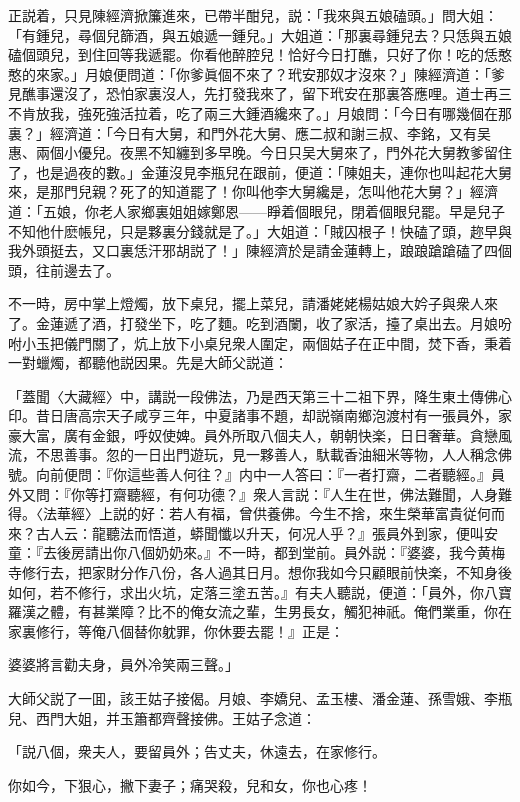 正説着，只見陳經濟掀簾進來，已帶半酣兒，説：「我來與五娘磕頭。」問大姐：「有鍾兒，尋個兒篩酒，與五娘遞一鍾兒。」大姐道：「那裏尋鍾兒去？只恁與五娘磕個頭兒，到住回等我遞罷。你看他醉腔兒！恰好今日打醮，只好了你！吃的恁憨憨的來家。」月娘便問道：「你爹眞個不來了？玳安那奴才沒來？」陳經濟道：「爹見醮事還沒了，恐怕家裏沒人，先打發我來了，留下玳安在那裏答應哩。道士再三不肯放我，強死強活拉着，吃了兩三大鍾酒纔來了。」月娘問：「今日有哪幾個在那裏？」經濟道：「今日有大舅，和門外花大舅、應二叔和謝三叔、李銘，又有吴惠、兩個小優兒。夜黑不知纏到多早晚。今日只吴大舅來了，門外花大舅教爹留住了，也是過夜的數。」金蓮沒見李瓶兒在跟前，便道：「陳姐夫，連你也叫起花大舅來，是那門兒親？死了的知道罷了！你叫他李大舅纔是，怎叫他花大舅？」經濟道：「五娘，你老人家鄉裏姐姐嫁鄭恩——睜着個眼兒，閉着個眼兒罷。早是兒子不知他什麽帳兒，只是夥裏分錢就是了。」大姐道：「賊囚根子！快磕了頭，趂早與我外頭挺去，又口裏恁汗邪胡説了！」陳經濟於是請金蓮轉上，踉踉蹌蹌磕了四個頭，往前邊去了。

不一時，房中掌上燈燭，放下桌兒，擺上菜兒，請潘姥姥楊姑娘大妗子與衆人來了。金蓮遞了酒，打發坐下，吃了麵。吃到酒闌，收了家活，擡了桌出去。月娘吩咐小玉把儀門關了，炕上放下小桌兒衆人圍定，兩個姑子在正中間，焚下香，秉着一對蠟燭，都聽他説因果。先是大師父説道：

「蓋聞〈大藏經〉中，講説一段佛法，乃是西天第三十二祖下界，降生東土傳佛心印。昔日唐高宗天子咸亨三年，中夏諸事不題，却説嶺南鄉泡渡村有一張員外，家豪大富，廣有金銀，呼奴使婢。員外所取八個夫人，朝朝快楽，日日奢華。貪戀風流，不思善事。忽的一日出門遊玩，見一夥善人，馱載香油細米等物，人人稱念佛號。向前便問：『你這些善人何往？』内中一人答曰：『一者打齋，二者聽經。』員外又問：『你等打齋聽經，有何功德？』衆人言説：『人生在世，佛法難聞，人身難得。〈法華經〉上説的好：若人有福，曾供養佛。今生不捨，來生榮華富貴従何而來？古人云：龍聽法而悟道，蟒聞懺以升天，何况人乎？』張員外到家，便叫安童：『去後房請出你八個奶奶來。』不一時，都到堂前。員外説：『婆婆，我今黄梅寺修行去，把家財分作八份，各人過其日月。想你我如今只顧眼前快楽，不知身後如何，若不修行，求出火坑，定落三塗五苦。』有夫人聽説，便道：「員外，你八寶羅漢之體，有甚業障？比不的俺女流之輩，生男長女，觸犯神祇。俺們業重，你在家裏修行，等俺八個替你躭罪，你休要去罷！』正是：

婆婆將言勸夫身，員外冷笑兩三聲。」

大師父説了一囬，該王姑子接偈。月娘、李嬌兒、孟玉樓、潘金蓮、孫雪娥、李瓶兒、西門大姐，并玉簫都齊聲接佛。王姑子念道：

「説八個，衆夫人，要留員外；告丈夫，休遠去，在家修行。

你如今，下狠心，撇下妻子；痛哭殺，兒和女，你也心疼！

